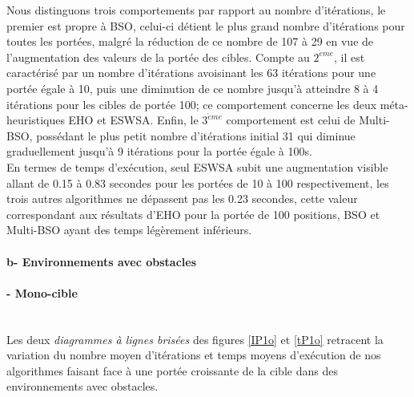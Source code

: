 	Nous distinguons trois comportements par rapport au nombre d'itérations, le premier est propre à BSO, celui-ci détient le plus grand nombre d'itérations pour toutes les portées, malgré la réduction de ce nombre de 107 à 29 en vue de l'augmentation des valeurs de la portée des cibles. 
	Compte au $2^{\grave{e}me}$, il est caractérisé par un nombre d'itérations avoisinant les 63 itérations pour une portée égale à 10, puis une diminution de ce nombre jusqu'à atteindre 8 à 4  itérations pour les cibles de portée 100; ce comportement concerne les deux méta-heuristiques EHO et ESWSA.
	Enfin, le $3^{\grave{e}me}$ comportement est celui de Multi-BSO, possédant le plus petit nombre d'itérations initial 31 qui diminue graduellement jusqu'à 9 itérations pour la portée égale à 100s.\\
	
	En termes de temps d'exécution, seul ESWSA subit une augmentation visible allant de 0.15 à 0.83 secondes pour les portées de 10 à 100 respectivement,  les trois autres algorithmes ne dépassent pas les 0.23 secondes, cette valeur correspondant aux résultats d'EHO pour la portée de 100 positions, BSO et Multi-BSO ayant des temps légèrement inférieurs.
	
	\noindent
	\hspace{-0.5cm}
	\begin{minipage}[t]{0.55\textwidth}
		\captionsetup{width=0.8\linewidth}
		\centering{}
		\label{IP5}
	\end{minipage}\hfill
	\hspace{-0.5cm}
	\begin{minipage}[t]{0.55\textwidth}
		\captionsetup{width=0.8\linewidth}
		\centering{}
		\label{tP5}
	\end{minipage}\hfill
	
	
	\paragraph{b- Environnements avec obstacles}
	\paragraph{- Mono-cible}
	\textbf{ }\\
	Les deux \textit{diagrammes à lignes brisées} des figures \ref{IP1o} et \ref{tP1o} retracent la variation du nombre moyen d'itérations et temps moyens d'exécution de nos algorithmes faisant face à une portée croissante de la cible dans des environnements avec obstacles.\\
	\vspace{-0.2cm}
	
